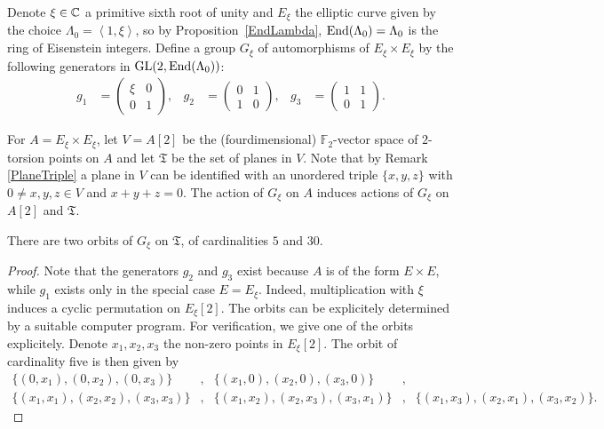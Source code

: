 \begin{definition}\label{elliptic6}
Denote $\xi\in\mathbb{C}$ a primitive sixth root of unity and $E_\xi$ the elliptic curve given by the choice $\Lambda_0 = \left<1,\xi\right>$, so by Proposition~\ref{EndLambda}, $\operatorname{End}(\Lambda_0)=\Lambda_0$ is the ring of Eisenstein integers. Define a group $G_\xi$ of automorphisms of $E_\xi\times E_\xi$ by the following generators in $\operatorname{GL}(2,\operatorname{End}(\Lambda_0))$:
\begin{align*}
g_1 &= \left( {\begin{array}{cc}
   \xi & 0 \\       0 & 1      
   \end{array} } \right),
 &
g_2 &= \left( {\begin{array}{cc}
   0 & 1 \\       1 & 0      
   \end{array} } \right),
 &
g_3 &= \left( {\begin{array}{cc}
   1 & 1 \\       0 & 1     
   \end{array} } \right).
\end{align*}
\end{definition}
For $A=E_\xi\times E_\xi$, let $V =A[2]$ be the (fourdimensional) $\mathbb F_2$-vector space of $2$-torsion points on $A$ and let $\mathfrak T$ be the set of planes in $V$. Note that by Remark \ref{PlaneTriple} a plane in $V$ can be identified with an unordered triple $\{x,y,z\}$ with $0\neq x,y,z\in V$ and $x+y+z=0$. The action of $G_\xi$ on $A$ induces actions of $G_\xi$ on $A[2]$ and $\mathfrak T$. 
\begin{lemma}\label{orbitesG}
There are two orbits of $G_\xi$ on $\mathfrak T$, of cardinalities $5$ and $30$.
\end{lemma}
\begin{proof}
Note that the generators $g_2$ and $g_3$ exist because $A$ is of the form $E\times E$, while $g_1$ exists only in the special case $E=E_\xi$. Indeed, multiplication with $\xi$ induces a cyclic permutation on $E_\xi[2]$. 
The orbits can be explicitely determined by a suitable computer program. For verification, we give one of the orbits explicitely.
Denote $x_1,x_2,x_3$ the non-zero points in $E_\xi[2]$. The orbit of cardinality five is then given by
\begin{align*}
\{(0,x_1),(0,x_2),(0,x_3)\} &,& \{(x_1,0),(x_2,0),(x_3,0)\} &,& \\
\{(x_1,x_1),(x_2,x_2),(x_3,x_3)\} &,& \{(x_1,x_2),(x_2,x_3),(x_3,x_1)\} &,& \{(x_1,x_3),(x_2,x_1),(x_3,x_2)\}.
\end{align*}
\end{proof}

